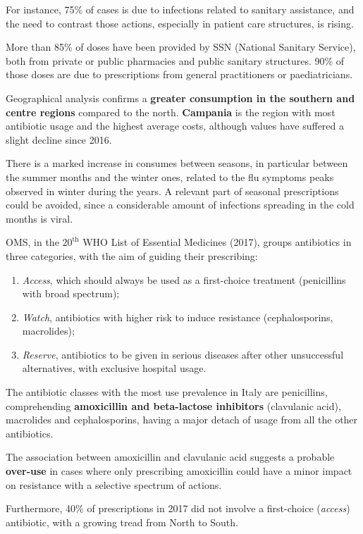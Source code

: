 For instance, 75\% of cases is due to infections related to sanitary assistance, and the need to contrast those actions, especially in patient care structures, is rising. 

More than 85\% of doses have been provided by SSN (National Sanitary Service), both from private or public pharmacies and public sanitary structures. 90\% of those doses are due to prescriptions from general practitioners or paediatricians.

Geographical analysis confirms a \textbf{greater consumption in the southern and centre regions} compared to the north. \textbf{Campania} is the region with most antibiotic usage and the highest average costs, although values have suffered a slight decline since 2016.

There is a marked increase in consumes between seasons, in particular between the summer months and the winter ones, related to the flu symptoms peaks observed in winter during the years. A relevant part of seasonal prescriptions could be avoided, since a considerable amount of infections spreading in the cold months is viral.

OMS, in the $20^{\text{th}}$ WHO List of Essential Medicines (2017), groups antibiotics in three categories, with the aim of guiding their prescribing:
\begin{enumerate}
	\item \textit{Access}, which should always be used as a first-choice treatment (penicillins with broad spectrum);
	\item \textit{Watch}, antibiotics with higher risk to induce resistance (cephalosporins, macrolides);
	\item \textit{Reserve}, antibiotics to be given in serious diseases after other unsuccessful alternatives, with exclusive hospital usage.
\end{enumerate}

The antibiotic classes with the most use prevalence in Italy are penicillins, comprehending \textbf{amoxicillin and beta-lactose inhibitors} (clavulanic acid), macrolides and cephalosporins, having a major detach of usage from all the other antibiotics.

The association between amoxicillin and clavulanic acid suggests a probable \textbf{over-use} in cases where only prescribing amoxicillin could have a minor impact on resistance with a selective spectrum of actions.

Furthermore, 40\% of prescriptions in 2017 did not involve a first-choice (\textit{access}) antibiotic, with a growing tread from North to South.

